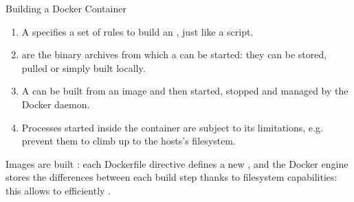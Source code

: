 \begin{frame}{Building a Docker Container}
\begin{enumerate}
  \item A  specifies a set of rules to build an , just like a script.
  \item {} are the binary archives from which a  can be started: they can be stored, pulled or simply built locally.
  \item A  can be built from an image and then started, stopped and managed by the Docker daemon.
  \item Processes started inside the container are subject to its limitations, e.g.  prevent them to climb up to the hosts's filesystem.
\end{enumerate}
Images are built : each Dockerfile directive defines a new , and the Docker engine stores the differences between each build step thanks to filesystem capabilities: this allows to efficiently .
\end{frame}


